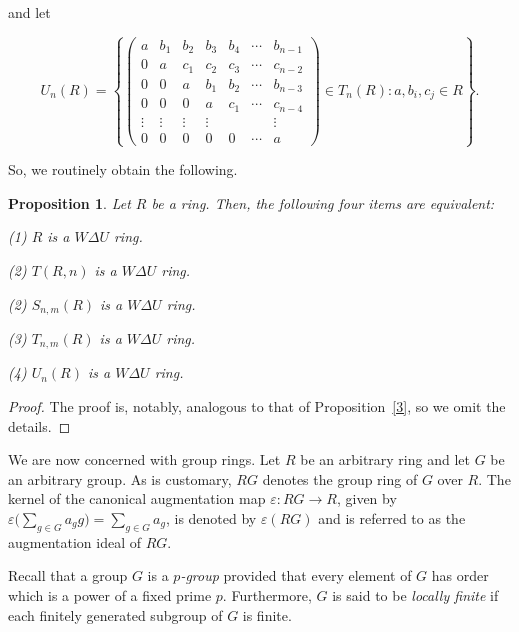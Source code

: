 \documentclass[12pt]{amsart}
\newtheorem{proposition}[theorem]{Proposition}
\theoremstyle{definition}
\begin{document}
\medskip

\noindent and let

\medskip

$$U_{n}(R)=\left\{ \begin{pmatrix}
	a & b_1 & b_2 & b_3 & b_4 & \cdots & b_{n-1} \\
	0 & a & c_1 & c_2 & c_3 & \cdots & c_{n-2} \\
	0 & 0 & a & b_1 & b_2 & \cdots & b_{n-3} \\
	0 & 0 & 0 & a & c_1 & \cdots & c_{n-4} \\
	\vdots & \vdots & \vdots & \vdots &  &  & \vdots \\
	0 &0 & 0 & 0 & 0 & \cdots & a
\end{pmatrix}\in T_{n}(R) :  a, b_i, c_j \in R \right\}.$$	

So, we routinely obtain the following.

\begin{proposition}
Let $R$ be a ring. Then, the following four items are equivalent:

(1) $R$ is a \(W\Delta U\) ring.

(2) $T(R,n)$ is a \(W\Delta U\) ring.

(2) $S_{n,m}(R)$ is a \(W\Delta U\) ring.

(3) $T_{n,m}(R)$ is a \(W\Delta U\) ring.

(4) $U_{n}(R)$ is a \(W\Delta U\) ring.
\end{proposition}

\begin{proof}
The proof is, notably, analogous to that of Proposition~\ref{3}, so we omit the details.
\end{proof}

We are now concerned with group rings. Let \(R\) be an arbitrary ring and let \(G\) be an arbitrary group. As is customary, \(RG\) denotes the group ring of \(G\) over \(R\). The kernel of the canonical augmentation map \(\varepsilon: RG \to R\), given by \(\varepsilon\big(\sum_{g\in G} a_g g\big) = \sum_{g\in G} a_g\), is denoted by \(\varepsilon(RG)\) and is referred to as the augmentation ideal of \(RG\).

\medskip

Recall that a group \(G\) is a {\it \(p\)-group} provided that every element of \(G\) has order which is a power of a fixed prime \(p\). Furthermore, \(G\) is said to be {\it locally finite} if each finitely generated subgroup of \(G\) is finite.

\medskip
\end{document}
